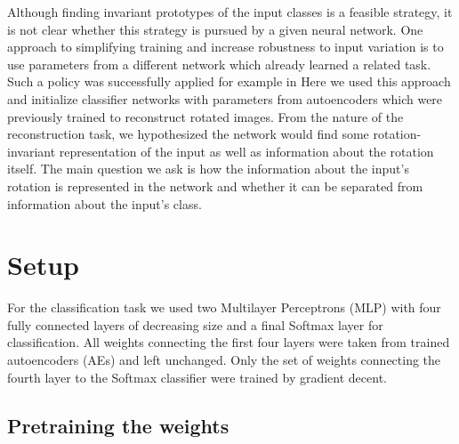 \documentclass[10pt,a4paper]{article}
\begin{document}
\noindent Although finding invariant prototypes of the input classes is a feasible strategy, it is not clear whether this strategy is pursued by a given neural network. 
One approach to simplifying training and increase robustness to input variation is to use parameters from a different network which already learned a related task. Such a policy was successfully applied for example in \cite{Benigo}\newline
Here we used this approach and initialize classifier networks with parameters from autoencoders which were previously trained to reconstruct rotated images. From the nature of the reconstruction task, we hypothesized the network would find some rotation-invariant representation of the input as well as information about the rotation itself. The main question we ask is how the information about the input's rotation is represented in the network and whether it can be separated from information about the input's class. 


\section{Setup}
For the classification task we used two Multilayer Perceptrons (MLP) with four fully connected layers of decreasing size and a final Softmax layer for classification. All weights connecting the first four layers were taken from trained autoencoders (AEs) and left unchanged. Only the set of weights connecting the fourth layer to the Softmax classifier were trained by gradient decent.



\subsection{Pretraining the weights}
\end{document}
